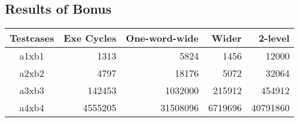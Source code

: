 \documentclass[12pt, a4paper]{article}
\begin{document}
\begin{CJK*}{UTF8}{bsmi}
        \subsection{Results of Bonus}
            \begin{center}
                \begin{tabular}{crrrr}
                \hline
                    Testcases & Exe Cycles & One-word-wide & Wider & 2-level \\
                \hline
                    a1xb1 & 1313    & 5824     & 1456    & 12000 \\
                    a2xb2 & 4797    & 18176    & 5072    & 32064 \\
                    a3xb3 & 142453  & 1032000  & 215912  & 454912 \\
                    a4xb4 & 4555205 & 31508096 & 6719696 & 40791860 \\
                \hline
                \end{tabular}
            \end{center}

    \end{CJK*}
\end{document}
